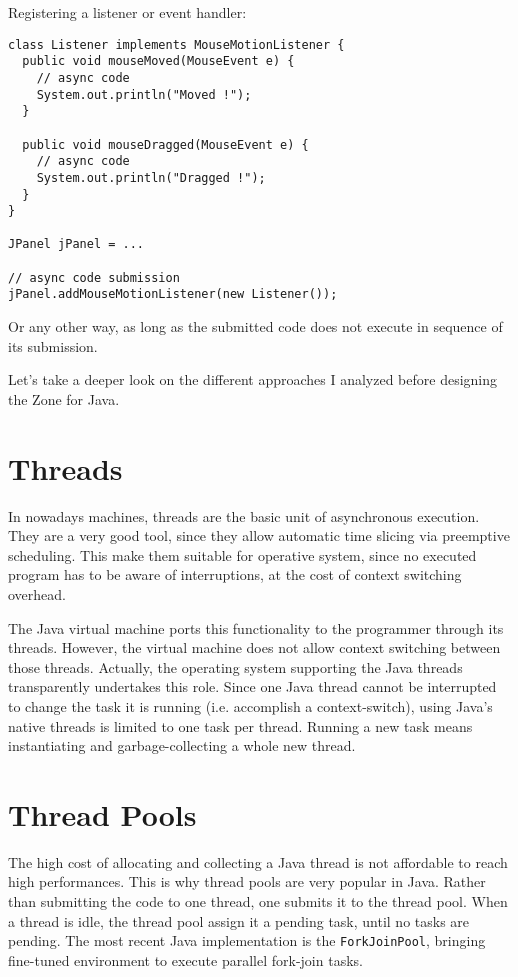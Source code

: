 Registering a listener or event handler:
\begin{lstlisting}
class Listener implements MouseMotionListener {
  public void mouseMoved(MouseEvent e) {
    // async code
    System.out.println("Moved !");
  }

  public void mouseDragged(MouseEvent e) {
    // async code
    System.out.println("Dragged !");
  }
}

JPanel jPanel = ...

// async code submission
jPanel.addMouseMotionListener(new Listener());
\end{lstlisting}

Or any other way, as long as the submitted code does not execute in sequence of its submission.

Let's take a deeper look on the different approaches I analyzed before designing the Zone for Java.


\section{Threads}

In nowadays machines, threads are the basic unit of asynchronous execution. They are a very good tool, since they allow automatic time slicing via preemptive scheduling. This make them suitable for operative system, since no executed program has to be aware of interruptions, at the cost of context switching overhead.

The Java virtual machine ports this functionality to the programmer through its threads. However, the virtual machine does not allow context switching between those threads. Actually, the operating system supporting the Java threads transparently undertakes this role. Since one Java thread cannot be interrupted to change the task it is running (i.e. accomplish a context-switch), using Java's native threads is limited to one task per thread. Running a new task means instantiating and garbage-collecting a whole new thread.

\section{Thread Pools}

The high cost of allocating and collecting a Java thread is not affordable to reach high performances. This is why thread pools are very popular in Java. Rather than submitting the code to one thread, one submits it to the thread pool. When a thread is idle, the thread pool assign it a pending task, until no tasks are pending. The most recent Java implementation is the \lstinline{ForkJoinPool}, bringing fine-tuned environment to execute parallel fork-join tasks.

